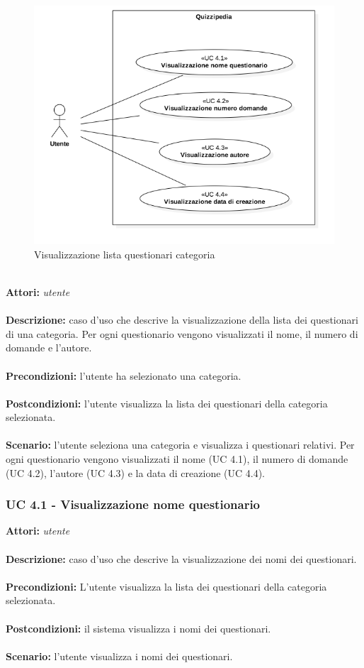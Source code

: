 \documentclass[a4paper,11pt]{article}
\begin{document}
\begin{figure}[h!]
\centering
\includegraphics[scale=0.6]{../immagini/UC4.png}
\caption{Visualizzazione lista questionari categoria}
\end{figure}
\ \\
\textbf{Attori:} \textit{utente}
\\ \\
\textbf{Descrizione:} caso d'uso che descrive la visualizzazione della lista dei questionari di una categoria. Per ogni questionario vengono visualizzati il nome, il numero di domande e l'autore.\\
\\
\textbf{Precondizioni:} l'utente ha selezionato una categoria.\\
\\
\textbf{Postcondizioni:} l’utente visualizza la lista dei questionari della categoria selezionata.\\
\\
\textbf{Scenario:} l’utente seleziona una categoria e visualizza i questionari relativi. Per ogni questionario vengono visualizzati il nome (UC 4.1), il numero di domande (UC 4.2), l'autore (UC 4.3) e la data di creazione (UC 4.4).\\


\subsubsection{UC 4.1 - Visualizzazione nome questionario}

\textbf{Attori:} \textit{utente}
\\ \\
\textbf{Descrizione:} caso d'uso che descrive la visualizzazione dei nomi dei questionari.\\
\\
\textbf{Precondizioni:} L'utente visualizza la lista dei questionari della categoria selezionata.\\
\\
\textbf{Postcondizioni:} il sistema visualizza i nomi dei questionari.\\
\\
\textbf{Scenario:} l’utente visualizza i nomi dei questionari.\\
\end{document}
